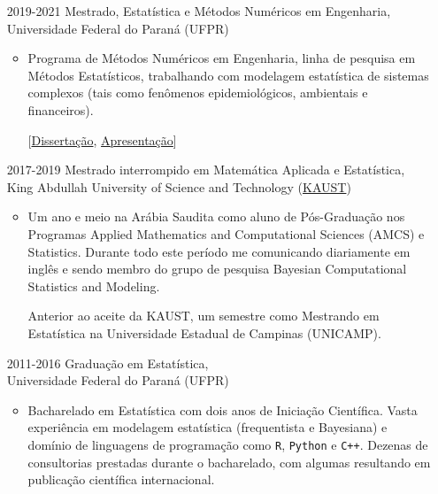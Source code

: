\documentclass[12pt]{article}
\begin{document}
\begin{itemize}
 \item[2019-2021] Mestrado, Estat\'{i}stica e M\'{e}todos Num\'{e}ricos
                  em Engenharia,\\
                  Universidade Federal do Paran\'{a} (UFPR)
  \begin{itemize}
   \item Programa de M\'{e}todos Num\'{e}ricos em Engenharia, linha de
         pesquisa em Métodos Estatísticos, trabalhando com modelagem
         estat\'{i}stica de sistemas complexos (tais como fen\^{o}menos
         epidemiol\'{o}gicos, ambientais e financeiros).
         
         [\href{https://henriquelaureano.github.io/THESIS/thesis/thesis.pdf}{\color{blue}Disserta\c{c}\~{a}o},
          \href{https://henriquelaureano.github.io/THESIS/aqua/slides.pdf}{\color{blue}Apresenta\c{c}\~{a}o}]
  \end{itemize}

 \item[2017-2019] Mestrado interrompido em Matem\'{a}tica Aplicada e
                  Estat\'{i}stica,\\
                  King Abdullah University of Science and Technology
                  (\href{https://kaust.edu.sa/en}{\color{blue}KAUST})
  \begin{itemize}
   \item Um ano e meio na Ar\'{a}bia Saudita como aluno de
         P\'{o}s-Gradua\c{c}\~{a}o nos Programas Applied Mathematics and
         Computational Sciences (AMCS) e Statistics. Durante todo este
         per\'{i}odo me comunicando diariamente em ingl\^{e}s e sendo
         membro do grupo de pesquisa Bayesian Computational Statistics
         and Modeling.

         Anterior ao aceite da KAUST, um semestre como Mestrando em
         Estat\'{i}stica na Universidade Estadual de Campinas (UNICAMP).
  \end{itemize}

 \item[2011-2016] Gradua\c{c}\~{a}o em Estat\'{i}stica,\\
                  Universidade Federal do Paran\'{a}
                  (UFPR)
  \begin{itemize}
   \item Bacharelado em Estat\'{i}stica com dois anos de
         Inicia\c{c}\~{a}o Cient\'{i}fica. Vasta experi\^{e}ncia em
         modelagem estat\'{i}stica (frequentista e Bayesiana) e
         dom\'{i}nio de linguagens de programa\c{c}\~{a}o como
         \texttt{R}, \texttt{Python} e \texttt{C++}. Dezenas de
         consultorias prestadas durante o bacharelado, com algumas
         resultando em publica\c{c}\~{a}o cient\'{i}fica internacional.
  \end{itemize}
\end{itemize}
\end{document}
